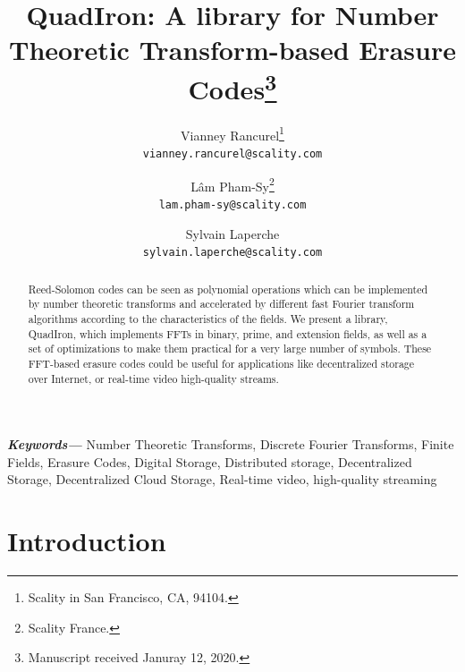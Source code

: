 \documentclass[oneside,9pt]{article}
\author{ Vianney Rancurel\thanks{Scality in San Francisco, CA, 94104.}\\ \texttt{vianney.rancurel@scality.com}
    \and L\^am Pham-Sy\thanks{Scality France.}\\ \texttt{lam.pham-sy@scality.com} 
    \and Sylvain Laperche\samethanks[3]\\ \texttt{sylvain.laperche@scality.com}
}
\title{QuadIron: A library for Number Theoretic Transform-based Erasure Codes\thanks{Manuscript received Januray 12, 2020.}}
\providecommand{\keywords}[1]{\textbf{\textit{Keywords---}} #1}
\begin{document}
\maketitle

\begin{abstract}
Reed-Solomon codes can be seen as polynomial operations which can be implemented by number theoretic transforms and accelerated by different fast Fourier transform algorithms according to the characteristics of the fields. We present a library, QuadIron, which implements FFTs in binary, prime, and extension fields, as well as a set of optimizations to make them practical for a very large number of symbols. These FFT-based erasure codes could be useful for applications like decentralized storage over Internet, or real-time video high-quality streams.
\end{abstract}


\keywords{Number Theoretic Transforms, Discrete Fourier Transforms, Finite Fields, Erasure Codes, Digital Storage, Distributed storage, Decentralized Storage, Decentralized Cloud Storage, Real-time video, high-quality streaming}


\section{Introduction}
\label{sec:introduction}
\end{document}
